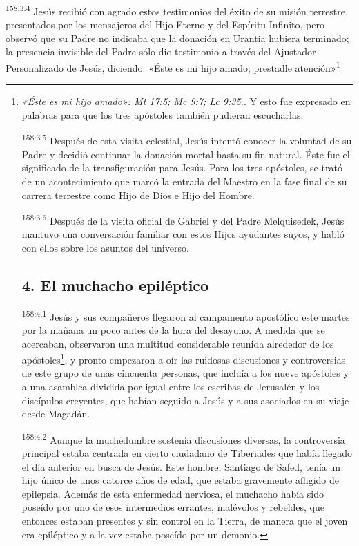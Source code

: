 \par 
\textsuperscript{158:3.4} Jesús recibió con agrado estos testimonios del éxito de su misión terrestre, presentados por los mensajeros del Hijo Eterno y del Espíritu Infinito, pero observó que su Padre no indicaba que la donación en Urantia hubiera terminado; la presencia invisible del Padre sólo dio testimonio a través del Ajustador Personalizado de Jesús, diciendo: «Éste es mi hijo amado; prestadle atención»\footnote{\textit{«Éste es mi hijo amado»: Mt 17:5; Mc 9:7; Lc 9:35.}. Y esto fue expresado en palabras para que los tres apóstoles también pudieran escucharlas.

\par 
\textsuperscript{158:3.5} Después de esta visita celestial, Jesús intentó conocer la voluntad de su Padre y decidió continuar la donación mortal hasta su fin natural. Éste fue el significado de la transfiguración para Jesús. Para los tres apóstoles, se trató de un acontecimiento que marcó la entrada del Maestro en la fase final de su carrera terrestre como Hijo de Dios e Hijo del Hombre.

\par 
\textsuperscript{158:3.6} Después de la visita oficial de Gabriel y del Padre Melquisedek, Jesús mantuvo una conversación familiar con estos Hijos ayudantes suyos, y habló con ellos sobre los asuntos del universo.

\section*{4. El muchacho epiléptico}
\par 
\textsuperscript{158:4.1} Jesús y sus compañeros llegaron al campamento apostólico este martes por la mañana un poco antes de la hora del desayuno. A medida que se acercaban, observaron una multitud considerable reunida alrededor de los apóstoles\footnote{\textit{Una multitud reunida}: Mc 9:14; Lc 9:37.}, y pronto empezaron a oír las ruidosas discusiones y controversias de este grupo de unas cincuenta personas, que incluía a los nueve apóstoles y a una asamblea dividida por igual entre los escribas de Jerusalén y los discípulos creyentes, que habían seguido a Jesús y a sus asociados en su viaje desde Magadán.

\par 
\textsuperscript{158:4.2} Aunque la muchedumbre sostenía discusiones diversas, la controversia principal estaba centrada en cierto ciudadano de Tiberiades que había llegado el día anterior en busca de Jesús. Este hombre, Santiago de Safed, tenía un hijo único de unos catorce años de edad, que estaba gravemente afligido de epilepsia. Además de esta enfermedad nerviosa, el muchacho había sido poseído por uno de esos intermedios errantes, malévolos y rebeldes, que entonces estaban presentes y sin control en la Tierra, de manera que el joven era epiléptico y a la vez estaba poseído por un demonio.

}
